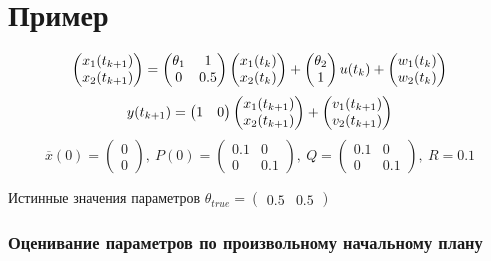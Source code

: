 \documentclass[a4paper,14pt]{extarticle}
\begin{document}
\section{Пример}

\[
  \begin{pmatrix} x_1(t_{k+1}) \\ x_2(t_{k+1}) \end{pmatrix} =
  \begin{pmatrix} \theta_1 & 1 \\ 0 & 0.5 \end{pmatrix}
  \begin{pmatrix} x_1(t_k) \\ x_2(t_k) \end{pmatrix}
  + 
	\begin{pmatrix} \theta_2 \\ 1 \end{pmatrix}
	u(t_k) 
  + \begin{pmatrix} w_1(t_k) \\ w_2(t_k) \end{pmatrix}
\]
\[
  y(t_{k+1}) =
	\begin{pmatrix} 1 & 0 \end{pmatrix}
	\begin{pmatrix} x_1(t_{k+1}) \\ x_2(t_{k+1}) \end{pmatrix} +
  \begin{pmatrix} v_1(t_{k+1}) \\ v_2(t_{k+1}) \end{pmatrix}
\]
\[
  \overline{x}(0) = \begin{pmatrix} 0 \\ 0 \end{pmatrix},\
  P(0) = \begin{pmatrix} 0.1 & 0 \\ 0 & 0.1 \end{pmatrix},\
  Q = \begin{pmatrix} 0.1 & 0 \\ 0 & 0.1 \end{pmatrix},\
  R = 0.1 
\]

Истинные значения параметров
$\theta_{true} = \begin{pmatrix} 0.5 & 0.5 \end{pmatrix}$ \\

\newpage
\subsubsection{Оценивание параметров по произвольному начальному плану}
\end{document}
